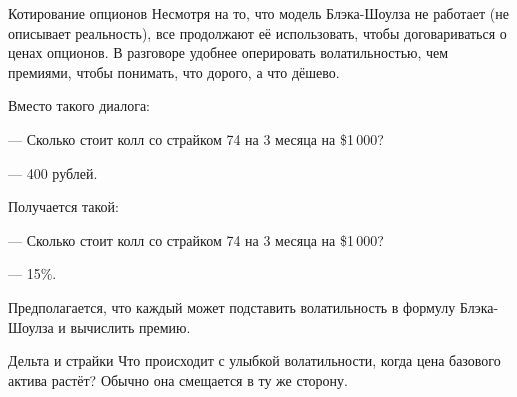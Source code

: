 \documentclass{beamer}
\begin{document}
\begin{frame}{Котирование опционов}
\justify
Несмотря на то, что модель Блэка-Шоулза не работает (не описывает реальность), все продолжают её использовать, чтобы договариваться о ценах опционов. В разговоре удобнее оперировать волатильностью, чем премиями, чтобы понимать, что дорого, а что дёшево.

\justify
Вместо такого диалога:

--- Сколько стоит колл со страйком 74 на 3 месяца на \$1\,000?

--- 400 рублей.

\justify
Получается такой:

--- Сколько стоит колл со страйком 74 на 3 месяца на \$1\,000?

--- 15\%.

\justify
Предполагается, что каждый может подставить волатильность в формулу Блэка-Шоулза и вычислить премию.
\end{frame}



\begin{frame}{Дельта и страйки}
\justify
Что происходит с улыбкой волатильности, когда цена базового актива растёт? Обычно она смещается в ту же сторону.

\centering
{}
\end{frame}
\end{document}
